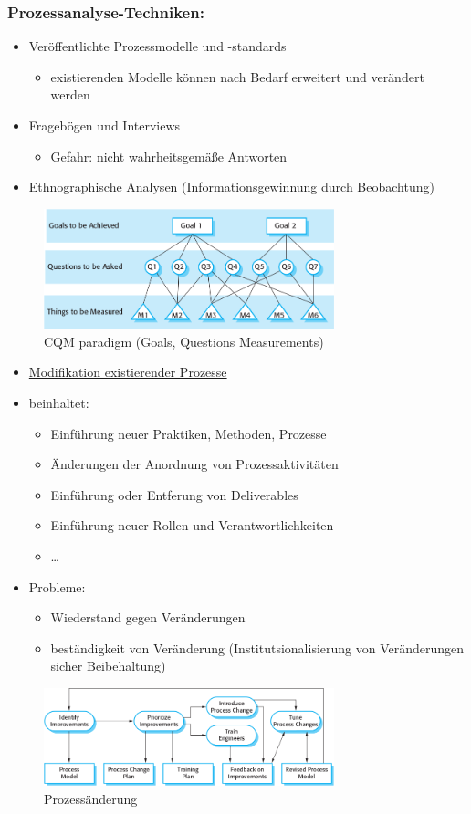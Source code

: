 \subsubsection{Prozessanalyse-Techniken:}
\begin{itemize}
    \item Veröffentlichte Prozessmodelle und -standards
    \begin{itemize}
        \item existierenden Modelle können nach Bedarf erweitert und verändert werden
    \end{itemize}
    \item Fragebögen und Interviews
    \begin{itemize}
        \item Gefahr: nicht wahrheitsgemäße Antworten
    \end{itemize}
    \item Ethnographische Analysen (Informationsgewinnung durch Beobachtung)
\end{itemize}
\begin{figure}[h]
    \centering
    \includegraphics[width=0.75\textwidth]{mainmatter/pics/cqm_paradigm.png}
    \caption{CQM paradigm (Goals, Questions Measurements)}
\end{figure}
\begin{itemize}
    \item \underline{Modifikation existierender Prozesse}
    \item beinhaltet: 
    \begin{itemize}
        \item Einführung neuer Praktiken, Methoden, Prozesse 
        \item Änderungen der Anordnung von Prozessaktivitäten
        \item Einführung oder Entferung von Deliverables
        \item Einführung neuer Rollen und Verantwortlichkeiten 
        \item \dots
    \end{itemize}
    \item Probleme:
    \begin{itemize}
        \item Wiederstand gegen Veränderungen
        \item beständigkeit von Veränderung (Institutsionalisierung von Veränderungen sicher Beibehaltung)
    \end{itemize}
\end{itemize}
\begin{figure}[h]
    \centering
    \includegraphics[width=0.75\textwidth]{mainmatter/pics/process_chainging.png}
    \caption{Prozessänderung}
\end{figure}
